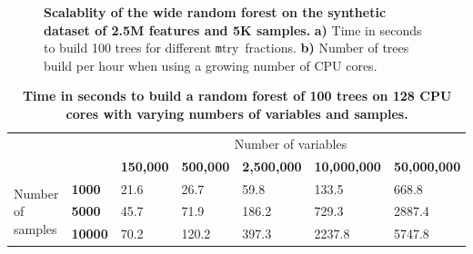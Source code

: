 \documentclass[10pt,letterpaper]{article}
\newcommand{\mtry}{{\texttt mtry}}
\begin{document}
\begin{figure}[tbhp]
\begin{adjustwidth}{-1.00in}{0in}
\begin{tabular}{ll}
\end{tabular}
\caption{{\bf Scalablity of the wide random forest on the synthetic dataset of 2.5M features and 5K samples.} 
  {\bf a)} Time in seconds to build 100 trees for different \mtry\ fractions. 
  {\bf b)} Number of trees build per hour when using a growing number of CPU cores.}
\label{figure:synth}
\end{adjustwidth}
\end{figure}



\begin{table}[!ht]
\begin{adjustwidth}{-1.00in}{0in}
\centering
\caption{
{\bf Time in seconds to build a random forest of 100
  trees on 128 CPU cores with varying numbers of variables and samples.}}
\begin{tabular}{|l|l|l|l|l|l|l|}
\hline
\multicolumn{2}{|l|}{\multirow{2}{*}{}}           & \multicolumn{5}{c|}{Number of variables} \\
\cline{3-7}
\multicolumn{2}{|l|}{}                               & \bf{150,000} & \bf{500,000} & \bf{2,500,000}  & \bf{10,000,000} & \bf{50,000,000} \\
\hline                                                            
\multirow{4}{*}{Number of samples}      & \bf{1000}  & 21.6  & 26.7  & 59.8  & 133.5  & 668.8 \\
                                        & \bf{5000}  & 45.7  & 71.9  & 186.2 & 729.3  & 2887.4 \\
                                        & \bf{10000} & 70.2  & 120.2 & 397.3 & 2237.8 & 5747.8 \\
\hline
\end{tabular}
\begin{flushleft} 
\end{flushleft}
\label{synthetictimingtable}
\end{adjustwidth}
\end{table}
\end{document}
